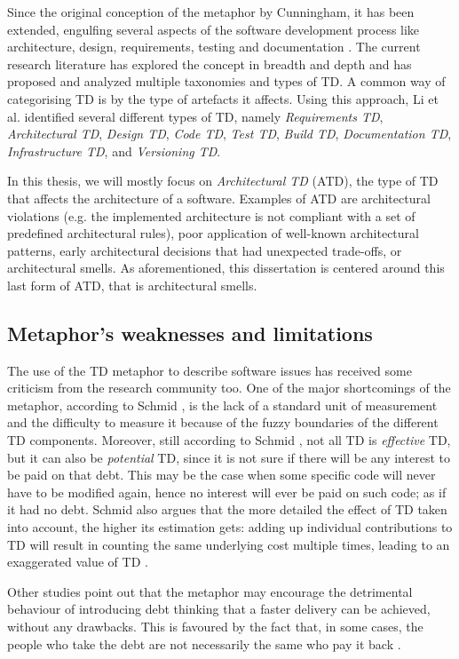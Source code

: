 Since the original conception of the metaphor by Cunningham, it has been extended, engulfing several aspects of the software development process like architecture, design, requirements, testing and documentation \cite{Brown2010}.
The current research literature has explored the concept in breadth and depth and has proposed and analyzed multiple taxonomies and types of TD.
A common way of categorising TD is by the type of artefacts it affects. Using this approach, Li et al. \cite{Li2015} identified several different types of TD, namely \emph{Requirements TD}, \emph{Architectural TD}, \emph{Design TD}, \emph{Code TD}, \emph{Test TD}, \emph{Build TD}, \emph{Documentation TD}, \emph{Infrastructure TD}, and \emph{Versioning TD}.

In this thesis, we will mostly focus on \emph{Architectural TD} (ATD), the type of TD that affects the architecture of a software.
Examples of ATD are architectural violations (e.g. the implemented architecture is not compliant with a set of predefined architectural rules), poor application of well-known architectural patterns, early architectural decisions that had unexpected trade-offs, or architectural smells.
As aforementioned, this dissertation is centered around this last form of ATD, that is architectural smells.

\subsection{Metaphor's weaknesses and limitations}
The use of the TD metaphor to describe software issues has received some criticism from the research community too.
One of the major shortcomings of the metaphor, according to Schmid \cite{Schmid2013}, is the lack of a standard unit of measurement and the difficulty to measure it because of the fuzzy boundaries of the different TD components.
Moreover, still according to Schmid \cite{Schmid2013}, not all TD is \textit{effective} TD, but it can also be \textit{potential} TD, since it is not sure if there will be any interest to be paid on that debt.
This may be the case when some specific code will never have to be modified again, hence no interest will ever be paid on such code; as if it had no debt.
Schmid also argues that the more detailed the effect of TD taken into account, the higher its estimation gets: adding up individual contributions to TD will result in counting the same underlying cost multiple times, leading to an exaggerated value of TD \cite{Schmid2013}.

Other studies point out that the metaphor may encourage the detrimental behaviour of introducing debt thinking that a faster delivery can be achieved, without any drawbacks. This is favoured by the fact that, in some cases, the people who take the debt are not necessarily the same who pay it back \cite{Allman2012}.


